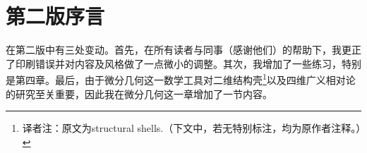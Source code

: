 \chapter*{第二版序言}
在第二版中有三处变动。首先，在所有读者与同事（感谢他们）的帮助下，我更正了印刷错误并对内容及风格做了一点微小的调整。其次，我增加了一些练习，特别是第四章。最后，由于微分几何这一数学工具对二维结构壳\footnote{译者注：原文为structural shells.（下文中，若无特别标注，均为原作者注释。）}以及四维广义相对论的研究至关重要，因此我在微分几何这一章增加了一节内容。

{\rightline{${}$}}

